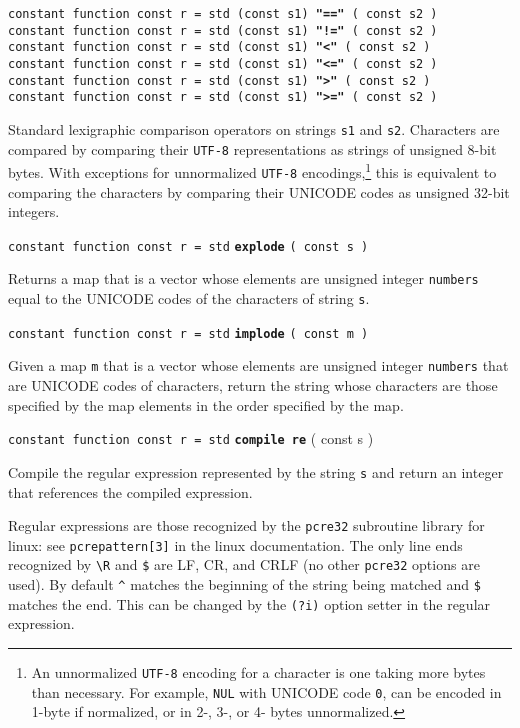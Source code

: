 \documentclass[12pt]{article}
\newcommand{\ttkey}[1]{{\tt \bfseries #1}}
\newenvironment{indpar}[1][0.3in]%
	{\begin{list}{}%
		     {\setlength{\itemsep}{0in}%
		      \setlength{\topsep}{0in}%
		      \setlength{\parsep}{1ex}%
		      \setlength{\labelwidth}{#1}%
		      \setlength{\leftmargin}{#1}%
		      \addtolength{\leftmargin}{\labelsep}}%
	 \item}%
	{\end{list}}
\begin{document}
{\tt constant function const r = std (const s1) \ttkey{"=="} ( const s2 )} \\
{\tt constant function const r = std (const s1) \ttkey{"!="} ( const s2 )} \\
{\tt constant function const r = std (const s1) \ttkey{"<"} ( const s2 )} \\
{\tt constant function const r = std (const s1) \ttkey{"<="} ( const s2 )} \\
{\tt constant function const r = std (const s1) \ttkey{">"} ( const s2 )} \\
{\tt constant function const r = std (const s1) \ttkey{">="} ( const s2 )}
\begin{indpar}
Standard lexigraphic comparison operators on strings {\tt s1} and {\tt s2}.
Characters are compared by comparing their {\tt UTF-8} representations
as strings of unsigned 8-bit bytes.  With exceptions for unnormalized
{\tt UTF-8} encodings,\footnote{
An unnormalized {\tt UTF-8} encoding for a character is one taking
more bytes than necessary.  For example, {\tt NUL} with UNICODE code {\tt 0},
can be encoded in 1-byte if normalized, or in 2-, 3-, or 4- bytes
unnormalized.}
this is equivalent to comparing the characters
by comparing their UNICODE codes as unsigned 32-bit integers.
\end{indpar}

{\tt constant function const r = std} \ttkey{explode} {\tt ( const s )}
\begin{indpar}
Returns a map that is a vector whose elements are unsigned integer {\tt numbers}
equal to the UNICODE codes of the characters of string {\tt s}.
\end{indpar}

{\tt constant function const r = std} \ttkey{implode} {\tt ( const m )}
\begin{indpar}
Given a map {\tt m} that is a vector whose elements are unsigned integer
{\tt numbers}
that are UNICODE codes of characters, return the string whose characters
are those specified by the map elements in the order specified by the map.
\end{indpar}

{\tt constant function const r = std} \ttkey{compile re} ( const s )
\begin{indpar}
Compile the regular expression represented by the string {\tt s}
and return an integer that references the compiled expression.

Regular expressions are those recognized by the {\tt pcre32}
subroutine library for linux: see {\tt pcrepattern[3]} in
the linux documentation.  The only line ends recognized
by {\tt \textbackslash R} and {\tt \$} are LF, CR, and CRLF (no other
{\tt pcre32} options are used).  By default {\tt \textasciicircum}
matches the beginning of the string being matched and {\tt \$} matches the end.
This can be changed by the {\tt (?i)} option setter in the
regular expression.
\end{indpar}
\end{document}

